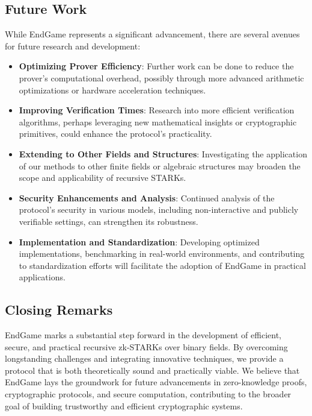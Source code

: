 \documentclass{article}
\theoremstyle{plain}
\theoremstyle{definition}
\theoremstyle{remark}
\theoremstyle{problem}
\begin{document}
\subsection{Future Work}

While EndGame represents a significant advancement, there are several avenues for future research and development:

\begin{itemize}
    \item \textbf{Optimizing Prover Efficiency}: Further work can be done to reduce the prover's computational overhead, possibly through more advanced arithmetic optimizations or hardware acceleration techniques.

    \item \textbf{Improving Verification Times}: Research into more efficient verification algorithms, perhaps leveraging new mathematical insights or cryptographic primitives, could enhance the protocol's practicality.

    \item \textbf{Extending to Other Fields and Structures}: Investigating the application of our methods to other finite fields or algebraic structures may broaden the scope and applicability of recursive STARKs.

    \item \textbf{Security Enhancements and Analysis}: Continued analysis of the protocol's security in various models, including non-interactive and publicly verifiable settings, can strengthen its robustness.

    \item \textbf{Implementation and Standardization}: Developing optimized implementations, benchmarking in real-world environments, and contributing to standardization efforts will facilitate the adoption of EndGame in practical applications.
\end{itemize}

\subsection{Closing Remarks}

EndGame marks a substantial step forward in the development of efficient, secure, and practical recursive zk-STARKs over binary fields. By overcoming longstanding challenges and integrating innovative techniques, we provide a protocol that is both theoretically sound and practically viable. We believe that EndGame lays the groundwork for future advancements in zero-knowledge proofs, cryptographic protocols, and secure computation, contributing to the broader goal of building trustworthy and efficient cryptographic systems.
\end{document}
